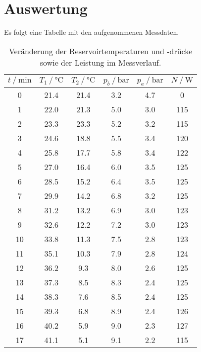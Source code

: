 \section{Auswertung}
\label{sec:Auswertung}

Es folgt eine Tabelle mit den aufgenommenen Messdaten.
\begin{table}[H]
  \centering
  \caption{Veränderung der Reservoirtemperaturen und -drücke sowie der Leistung im Messverlauf.}
  \label{tab:Messdaten}
  \begin{tabular}{S[table-format=2.0] S S S S S[table-format=3.0]}
    \toprule
    {$t \mathbin{/} \unit{\minute}$} 
    & {$T_1 \mathbin{/} \unit{\celsius}$} & {$T_2 \mathbin{/} \unit{\celsius}$} 
    & {$p_b \mathbin{/} \unit{\bar}$} & {$p_a \mathbin{/} \unit{\bar}$} 
    & {$N \mathbin{/} \unit{\watt}$} \\
     & {21.4} & {21.4} &   { 3.2} & {4.7} & {  0} \\
     1 & {22.0} & {21.3} &   { 5.0} & {3.0} & {115} \\
     2 & {23.3} & {23.3} &   { 5.2} & {3.2} & {115} \\
     3 & {24.6} & {18.8} &   { 5.5} & {3.4} & {120} \\
     4 & {25.8} & {17.7} &   { 5.8} & {3.4} & {122} \\
     5 & {27.0} & {16.4} &   { 6.0} & {3.5} & {125} \\
     6 & {28.5} & {15.2} &   { 6.4} & {3.5} & {125} \\
     7 & {29.9} & {14.2} &   { 6.8} & {3.2} & {125} \\
     8 & {31.2} & {13.2} &   { 6.9} & {3.0} & {123} \\
     9 & {32.6} & {12.2} &   { 7.2} & {3.0} & {123} \\
    10 & {33.8} & {11.3} &   { 7.5} & {2.8} & {123} \\
    11 & {35.1} & {10.3} &   { 7.9} & {2.8} & {124} \\
    12 & {36.2} & { 9.3} &   { 8.0} & {2.6} & {125} \\
    13 & {37.3} & { 8.5} &   { 8.3} & {2.4} & {125} \\
    14 & {38.3} & { 7.6} &   { 8.5} & {2.4} & {125} \\
    15 & {39.3} & { 6.8} &   { 8.9} & {2.4} & {126} \\
    16 & {40.2} & { 5.9} &   { 9.0} & {2.3} & {127} \\
    17 & {41.1} & { 5.1} &   { 9.1} & {2.2} & {115} \\

\end{tabular}
\end{table}
